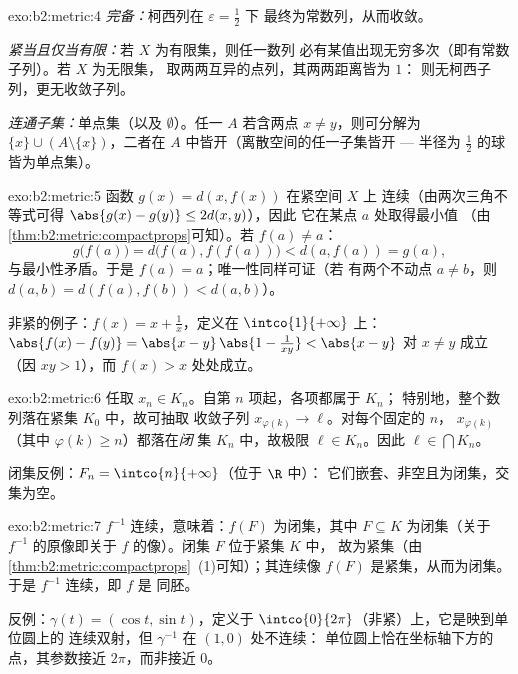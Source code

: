 \begin{solution}{exo:b2:metric:4}
\emph{完备：}柯西列在 $\varepsilon = \frac12$ 下
最终为常数列，从而收敛。

\emph{紧当且仅当有限：}若 $X$ 为有限集，则任一数列
必有某值出现无穷多次（即有常数子列）。若 $X$ 为无限集，
取两两互异的点列，其两两距离皆为 $1$：
则无柯西子列，更无收敛子列。

\emph{连通子集：}单点集（以及 $\emptyset$）。任一 $A$
若含两点 $x \neq y$，则可分解为 $\{x\} \cup (A
\setminus\{x\})$，二者在 $A$ 中皆开（离散空间的任一子集皆开 ---
半径为 $\frac12$ 的球皆为单点集）。
\end{solution}

\begin{solution}{exo:b2:metric:5}
函数 $g(x) = d(x, f(x))$ 在紧空间 $X$ 上
连续（由两次三角不等式可得 $\abs{g(x) - g(y)} \leq 2d(x,y)$），因此
它在某点 $a$ 处取得最小值
（由\cref{thm:b2:metric:compactprops}可知）。若 $f(a) \neq a$：
\[
g\bigl(f(a)\bigr) = d\bigl(f(a), f(f(a))\bigr) < d(a, f(a)) = g(a),
\]
与最小性矛盾。于是 $f(a) = a$；唯一性同样可证（若
有两个不动点 $a \neq b$，则 $d(a,b) = d(f(a), f(b)) < d(a,b)$）。

非紧的例子：$f(x) = x + \frac1x$，定义在 $\intco{1}{+\infty}$ 上：
$\abs{f(x) - f(y)} = \abs{x - y}\,\abs{1 - \frac{1}{xy}} < \abs{x -
y}$ 对 $x \neq y$ 成立（因 $xy > 1$），而 $f(x) > x$ 处处成立。
\end{solution}

\begin{solution}{exo:b2:metric:6}
任取 $x_n \in K_n$。自第 $n$ 项起，各项都属于 $K_n$；
特别地，整个数列落在紧集 $K_0$ 中，故可抽取
收敛子列 $x_{\varphi(k)} \to \ell$。对每个固定的 $n$，
$x_{\varphi(k)}$（其中 $\varphi(k) \geq n$）都落在\emph{闭}
集 $K_n$ 中，故极限 $\ell \in K_n$。因此 $\ell \in \bigcap K_n$。

闭集反例：$F_n = \intco{n}{+\infty}$（位于 $\R$ 中）：
它们嵌套、非空且为闭集，交集为空。
\end{solution}

\begin{solution}{exo:b2:metric:7}
$f^{-1}$ 连续，意味着：$f(F)$ 为闭集，其中 $F
\subseteq K$ 为闭集（关于 $f^{-1}$ 的原像即关于
$f$ 的像）。闭集 $F$ 位于紧集 $K$ 中，
故为紧集（由\cref{thm:b2:metric:compactprops}~(1)可知）；其连续像
$f(F)$ 是紧集，从而为闭集。于是 $f^{-1}$ 连续，即 $f$ 是
同胚。

反例：$\gamma(t) = (\cos t, \sin t)$，定义于
$\intco{0}{2\pi}$（非紧）上，它是映到单位圆上的
连续双射，但 $\gamma^{-1}$ 在 $(1,0)$ 处不连续：
单位圆上恰在坐标轴下方的点，其参数接近
$2\pi$，而非接近 $0$。
\end{solution}

